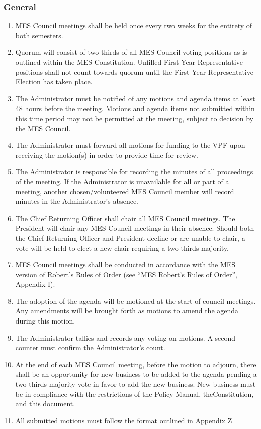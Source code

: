 \hypertarget{general-1}{%
 \subsubsection{General}
 \label{general-1}}

\begin{enumerate}
 \item
  MES Council meetings shall be held once every two weeks for the
  entirety of both semesters.
 \item
  Quorum will consist of two-thirds of all MES Council voting positions
  as is outlined within the MES Constitution. Unfilled First Year
  Representative positions shall not count towards quorum until the
  First Year Representative Election has taken place.
 \item
  The Administrator must be notified of any motions and agenda items at
  least 48 hours before the meeting. Motions and agenda items not
  submitted within this time period may not be permitted at the meeting,
  subject to decision by the MES Council.
 \item
  The Administrator must forward all motions for funding to the VPF upon
  receiving the motion(s) in order to provide time for review.
 \item
  The Administrator is responsible for recording the minutes of all
  proceedings of the meeting. If the Administrator is unavailable for
  all or part of a meeting, another chosen/volunteered MES Council
  member will record minutes in the Administrator's absence.
 \item
  The Chief Returning Officer shall chair all MES Council meetings. The
  President will chair any MES Council meetings in their absence. Should
  both the Chief Returning Officer and President decline or are unable
  to chair, a vote will be held to elect a new chair requiring a two
  thirds majority.
 \item
  MES Council meetings shall be conducted in accordance with the MES
  version of Robert's Rules of Order (see ``MES Robert's Rules of
  Order'', Appendix I).
 \item
  The adoption of the agenda will be motioned at the start of council
  meetings. Any amendments will be brought forth as motions to amend the
  agenda during this motion.
 \item
  The Administrator tallies and records any voting on motions. A second
  counter must confirm the Administrator's count.
 \item
  At the end of each MES Council meeting, before the motion to adjourn,
  there shall be an opportunity for new business to be added to the
  agenda pending a two thirds majority vote in favor to add the new
  business. New business must be in compliance with the restrictions of
  the Policy Manual, theConstitution, and this document.
 \item
  All submitted motions must follow the format outlined in Appendix Z

\end{enumerate}

